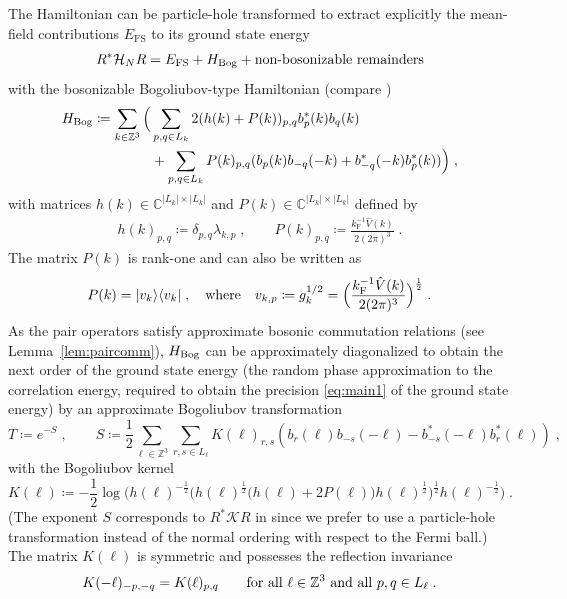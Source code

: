 \documentclass[12pt,a4paper]{article}
\numberwithin{equation}{section}
\newcommand{\cK}{\mathcal{K}}
\newcommand{\CCC}{\mathbb{C}}
\newcommand{\Zbb}{\mathbb{Z}}
\newcommand{\1}{\mathbb{I}}
\newcommand{\Bog}{\textnormal{Bog}}
\newcommand{\F}{\mathrm{F}}
\newcommand{\FS}{\mathrm{FS}}
\newcommand{\kF}{k_\F}
\newcommand{\Zstar}{\mathbb{Z}^3} %
\newcommand{\Z}{\mathbb{Z}}
\newcommand{\Hcal}{\mathcal{H}}
\newcommand{\half}{\frac{1}{2}}
\theoremstyle{plain}
\theoremstyle{definition}
\theoremstyle{remark}
\theoremstyle{plain}
\theoremstyle{definition}
\theoremstyle{remark}
\begin{document}
The Hamiltonian can be particle-hole transformed to extract explicitly the mean-field contributions $E_{\FS}$ \cite[Eqs.~(1.2) and (1.11)]{CHN24} to its ground state energy
\begin{equation}
   R^* \Hcal_N R = E_{\FS} + H_{\Bog} + \textnormal{non-bosonizable remainders}
\end{equation}
with the bosonizable Bogoliubov-type Hamiltonian (compare \cite[(1.34)]{CHN23})
\begin{equation} \label{eq:HBog}
\begin{split}
	H_{\Bog}
	\coloneq \sum_{k \in \Zstar} \Big( & \sum_{p,q \in L_k} 2 (h(k) + P(k))_{p,q} b^*_p(k) b_q(k) \\
	& 		+ \sum_{p,q \in L_k} P(k)_{p,q} (b_p(k) b_{-q}(-k) + b^*_{-q}(-k) b^*_p(k)) \Big) \;,
\end{split}
\end{equation}
with matrices $ h(k) \in \CCC^{|L_k| \times |L_k|}$ and $P(k) \in \CCC^{|L_k| \times |L_k|} $ defined by
\begin{equation} \label{eq:HkPk}
\begin{aligned}
	h(k)_{p,q} \coloneq \delta_{p,q} \lambda_{k,p} \;, \qquad
	P(k)_{p,q} \coloneq \frac{\kF^{-1}\hat{V}(k) }{2 (2 \pi)^3} \;.
\end{aligned}
\end{equation}
The matrix $ P(k) $ is rank-one and can also be written as
\begin{equation}P(k) = \lvert v_k \rangle \langle v_k \rvert \;, \quad \textnormal{where} \quad v_{k,p} \coloneq g_k^{1/2} = \Big( \frac{\kF^{-1} \hat{V}(k) }{2 (2 \pi)^3} \Big)^\half \;.
\end{equation}
 As the pair operators satisfy approximate bosonic commutation relations (see Lemma~\ref{lem:paircomm}), $ H_{\Bog} $ can be approximately diagonalized to obtain the next order of the ground state energy (the random phase approximation to the correlation energy, required to obtain the precision \eqref{eq:main1} of the ground state energy) by an approximate Bogoliubov transformation \cite[Thm.~1.4]{CHN23}
\begin{equation} \label{eq:T}
	T \coloneq e^{-S} \;, \qquad
	S \coloneq \frac{1}{2}\sum_{\ell\in \Zstar}\sum_{r,s\in L_\ell}K(\ell)_{r,s}\left(b_r(\ell)b_{-s}(-\ell)-b^*_{-s}(-\ell)b^*_{r}(\ell)\right) \;,
\end{equation}
with the Bogoliubov kernel
\begin{equation} \label{eq:K}
	K(\ell) \coloneq - \half \log \bigg( h(\ell)^{-\half}
		\Big( h(\ell)^{\half} \big( h(\ell) + 2 P(\ell) \big) h(\ell)^{\half}\Big)^{\half}
		h(\ell)^{-\half} \bigg) \;.
\end{equation}
(The exponent $ S $ corresponds to $ R^* \cK R $ in \cite{CHN23} since we prefer to use a particle-hole transformation instead of the normal ordering with respect to the Fermi ball.)
The matrix $K(\ell)$ is symmetric and possesses the reflection invariance
\begin{equation}
  K(-\ell)_{-p,-q} = K(\ell)_{p,q} \qquad \textnormal{for all } \ell \in \Zbb^3 \textnormal{ and all }p,q \in L_\ell\;.
\end{equation}
\end{document}
